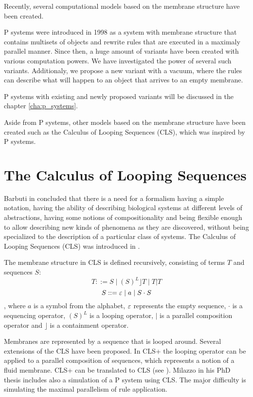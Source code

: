 
Recently, several computational models based on the membrane structure have been created.


P systems were introduced in 1998 as a system with membrane structure that contains multisets of objects and rewrite rules that are executed in a maximaly parallel manner. Since then, a huge amount of variants have been created with various computation powers. We have investigated the power of several such variants. Additionaly, we propose a new variant with a vacuum, where the rules can describe what will happen to an object that arrives to an empty membrane.

P systems with existing and newly proposed variants will be discussed in the chapter \ref{cha:p_systems}.

Aside from P systems, other models based on the membrane structure have been created such as the Calculus of Looping Sequences (CLS), which was inspired by P systems.


\section{The Calculus of Looping Sequences} %
\label{sec:calculus_of_looping_sequences}

Barbuti in \cite{Barbuti07CLS} concluded that there is a need for a formalism having a simple notation, having the ability of describing biological systems at different levels of abstractions, having some notions of compositionality and being flexible enough to allow describing new kinds of phenomena as they are discovered, without being specialized to the description of a particular class of systems. The Calculus of Looping Sequences (CLS) was introduced in \cite{Barbuti07CLS}.

The membrane structure in CLS is defined recursively, consisting of terms $T$ and sequences $S$:
$$ T ::= S \mid (S)^L\rfloor T \mid T|T$$
$$ S ::= \varepsilon \mid a \mid S\cdot S $$
, where $a$ is a symbol from the alphabet, $\varepsilon$ represents the empty sequence, $\cdot$ is a sequencing operator, $(S)^L$ is a looping operator, $|$ is a parallel composition operator and $\rfloor$ is a containment operator.

Membranes are represented by a sequence that is looped around.
Several extensions of the CLS have been proposed. In CLS+ the looping operator can be applied to a parallel composition of sequences, which represents a notion of a fluid membrane.
CLS+ can be translated to CLS (see \cite{Barbuti07CLS}).
Milazzo in his PhD thesis \cite{Milazzo07CLS} includes also a simulation of a P system using CLS. The major difficulty is simulating the maximal parallelism of rule application.

